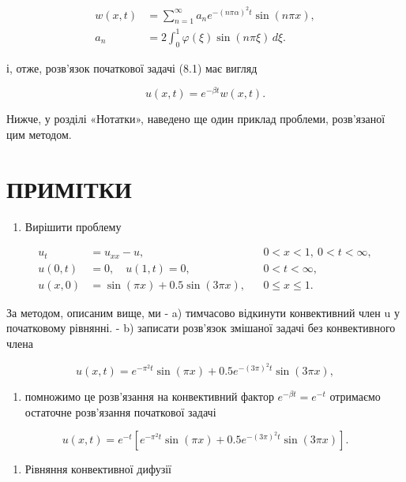 \documentclass[
  ukrainian,
]{article}
\providecommand{\tightlist}{%
  \setlength{\itemsep}{0pt}\setlength{\parskip}{0pt}}
\begin{document}
\[
\begin{aligned}
w(x,t)&=\sum_{n=1}^{\infty} a_n e^{-(n\pi\alpha)^2 t}\sin(n\pi x),\\
a_n&=2\int_0^1 \varphi(\xi)\sin(n\pi \xi)\,d\xi.
\end{aligned}
\]

і, отже, розв'язок початкової задачі (8.1) має вигляд

\[
u(x, t) = e^{-\beta t}w(x, t).
\]

Нижче, у розділі «Нотатки», наведено ще один приклад проблеми,
розв'язаної цим методом.

\section{ПРИМІТКИ}\label{ux43fux440ux438ux43cux456ux442ux43aux438}

\begin{enumerate}
\def\labelenumi{\arabic{enumi}.}
\tightlist
\item
  Вирішити проблему
\end{enumerate}

\[
\begin{aligned}
u_t &= u_{xx} - u, && 0 < x < 1,\ 0 < t < \infty, \\
u(0,t) &= 0,\quad u(1,t) = 0, && 0 < t < \infty, \\
u(x,0) &= \sin(\pi x) + 0.5\sin(3\pi x), && 0 \leqslant x \leqslant 1.
\end{aligned}
\]

За методом, описаним вище, ми - a) тимчасово відкинути конвективний член
u у початковому рівнянні. - b) записати розв'язок змішаної задачі без
конвективного члена

\[
u(x, t) = e^{-\pi^2 t} \sin(\pi x) + 0.5e^{-(3\pi)^2 t} \sin(3\pi x),
\]

\begin{enumerate}
\def\labelenumi{\alph{enumi})}
\setcounter{enumi}{2}
\tightlist
\item
  помножимо це розв'язання на конвективний фактор
  \(e^{-\beta t}=e^{-t}\) отримаємо остаточне розв'язання початкової
  задачі
\end{enumerate}

\[
u(x, t) = e^{-t} \left[ e^{-\pi^2 t} \sin(\pi x) + 0.5e^{-(3\pi)^2 t} \sin(3\pi x) \right].
\]

\begin{enumerate}
\def\labelenumi{\arabic{enumi}.}
\setcounter{enumi}{1}
\tightlist
\item
  Рівняння конвективної дифузії
\end{enumerate}
\end{document}
